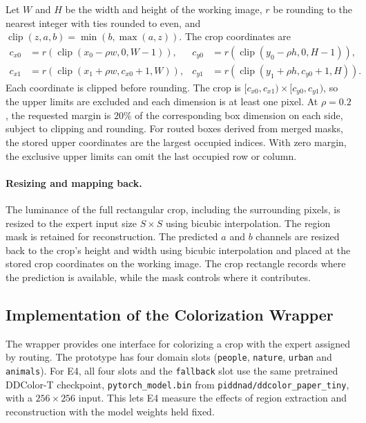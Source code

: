 \documentclass{FastFyp}
\begin{document}
Let $W$ and $H$ be the width and height of the working image,
$r$ be rounding to the nearest integer with ties rounded to even, and
$\operatorname{clip}(z,a,b)=\min(b,\max(a,z))$. The crop coordinates are
\begin{equation}
\begin{aligned}
c_{x0} &= r\!\left(\operatorname{clip}(x_0-\rho w,0,W-1)\right), &
c_{y0} &= r\!\left(\operatorname{clip}(y_0-\rho h,0,H-1)\right),\\
c_{x1} &= r\!\left(\operatorname{clip}(x_1+\rho w,c_{x0}+1,W)\right), &
c_{y1} &= r\!\left(\operatorname{clip}(y_1+\rho h,c_{y0}+1,H)\right).
\end{aligned}
\end{equation}
Each coordinate is clipped before rounding. The crop is
$[c_{x0},c_{x1})\times[c_{y0},c_{y1})$, so the upper limits are excluded and
each dimension is at least one pixel. At $\rho=0.2$, the requested margin is
$20\%$ of the corresponding box dimension on each side, subject to clipping
and rounding. For routed boxes derived from merged masks, the stored upper
coordinates are the largest occupied indices. With zero margin, the exclusive
upper limits can omit the last occupied row or column.

\paragraph{Resizing and mapping back.} The luminance of the full rectangular crop,
including the surrounding pixels, is resized to the expert input size
$S\times S$ using bicubic interpolation. The region mask is retained for
reconstruction. The predicted $a$ and $b$ channels are resized back to the crop's
height and width using bicubic interpolation and placed at the stored crop
coordinates on the working image. The crop rectangle records where the
prediction is available, while the mask controls where it contributes.

\subsection{Implementation of the Colorization Wrapper}
\label{sec:b_colorization}
The wrapper provides one interface for colorizing a crop with the expert
assigned by routing. The prototype has four domain slots
(\texttt{people}, \texttt{nature}, \texttt{urban} and \texttt{animals}). For E4,
all four slots and the \texttt{fallback} slot use the same pretrained DDColor-T
checkpoint, \texttt{pytorch\_model.bin} from
\texttt{piddnad/\allowbreak ddcolor\_paper\_tiny},
with a $256\times256$ input. This lets E4
measure the effects of region extraction and reconstruction with the model
weights held fixed.
\end{document}
